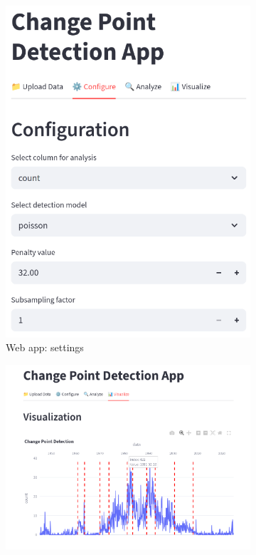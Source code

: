 \begin{figure}[H]
    \centering
    \begin{subfigure}{0.34\textwidth}
        \centering
        \includegraphics[width=\textwidth]{figures/changepoints-settings.png}
        \caption{Web app: settings}
        \label{fig:changepoints-settings}
    \end{subfigure}
    \hfill
    \begin{subfigure}{0.65\textwidth}
        \centering
        \includegraphics[width=\textwidth]{figures/changepoints.png}

\end{subfigure}
\end{figure}
